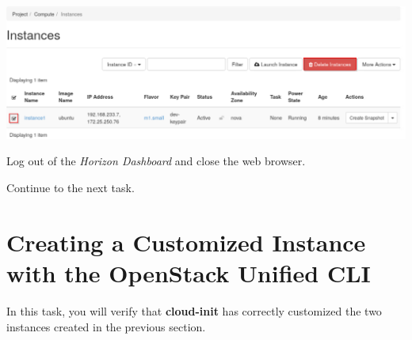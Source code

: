 \documentclass[letterpaper, 12pt]{article}
\begin{document}
\begin{enumerate}
\begin{labstep}
        \begin{center}
            \includegraphics[width=\linewidth]{images/part2/step16.png}
        \end{center}
    \end{labstep}

    \begin{labstep}
        Log out of the \textit{Horizon Dashboard} and close the web browser.
    \end{labstep}

    \begin{labstep}
        Continue to the next task.
    \end{labstep}

\end{enumerate}

\section{Creating a Customized Instance with the OpenStack Unified CLI}\label{sec:creating-a-customized-instance-with-the-openstack-unified-cli}
In this task, you will verify that \textbf{cloud-init} has correctly customized the two instances created in the previous section.
\end{document}

